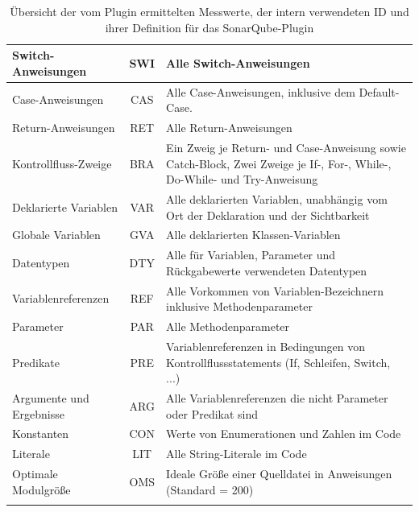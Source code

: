 \documentclass[gb,ngerman]{stthesis}
\begin{document}
\begin{center}
\begin{longtabu}{|p{0.25\textwidth}|c|p{0.6\textwidth}|}
    				\hline
    				Switch-Anweisungen & SWI & Alle Switch-Anweisungen \\
    				\hline
    				Case-Anweisungen & CAS & Alle Case-Anweisungen, inklusive dem Default-Case. \\
    				\hline
    				Return-Anweisungen & RET & Alle Return-Anweisungen \\
    				\hline
    				Kontrollfluss-Zweige & BRA & Ein Zweig je Return- und Case-Anweisung sowie Catch-Block, Zwei Zweige je If-, For-, While-, Do-While- und Try-Anweisung \\
    				\hline
    				Deklarierte Variablen & VAR & Alle deklarierten Variablen, unabhängig vom Ort der Deklaration und der Sichtbarkeit \\
    				\hline
    				Globale Variablen & GVA & Alle deklarierten Klassen-Variablen \\
    				\hline
    				Datentypen & DTY & Alle für Variablen, Parameter und Rückgabewerte verwendeten Datentypen \\
    				\hline
    				Variablenreferenzen & REF & Alle Vorkommen von Variablen-Bezeichnern inklusive Methodenparameter \\
    				\hline
    				Parameter & PAR & Alle Methodenparameter \\
    				\hline
    				Predikate & PRE & Variablenreferenzen in Bedingungen von Kontrollflussstatements (If, Schleifen, Switch, ...) \\
    				\hline
    				Argumente und Ergebnisse & ARG & Alle Variablenreferenzen die nicht Parameter oder Predikat sind \\
    				\hline
    				Konstanten & CON & Werte von Enumerationen und Zahlen im Code \\
    				\hline
    				Literale & LIT & Alle String-Literale im Code \\
    				\hline
    				Optimale Modulgröße & OMS & Ideale Größe einer Quelldatei in Anweisungen \newline(Standard = 200) \\
    				\hline
    				\caption{Übersicht der vom Plugin ermittelten Messwerte, der intern verwendeten ID und ihrer Definition für das SonarQube-Plugin}
					\label{messwerte} \\
  				\end{longtabu}  
  			\end{center}
\end{document}
